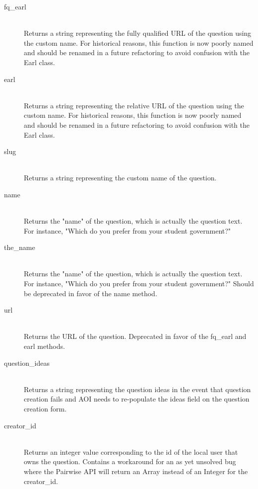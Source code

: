 \documentclass[11pt]{book}
\begin{document}
\begin{description}
  
  \item[fq\_earl]  \hfill \\
  \emph{} Returns a string representing the fully qualified URL of the question using the custom name.  For historical reasons, this function is now poorly named and should be renamed in a future refactoring to avoid confusion with the Earl class.
  
  \item[earl]  \hfill \\
  \emph{} Returns a string representing the relative URL of the question using the custom name.  For historical reasons, this function is now poorly named and should be renamed in a future refactoring to avoid confusion with the Earl class.
  
  \item[slug]  \hfill \\
  \emph{} Returns a string representing the custom name of the question.
  
  \item[name]  \hfill \\
  \emph{} Returns the "name" of the question, which is actually the question text.  For instance, "Which do you prefer from your student government?"
  
  
  \item[the\_name]  \hfill \\
  \emph{} Returns the "name" of the question, which is actually the question text.  For instance, "Which do you prefer from your student government?"  Should be deprecated in favor of the name method.
  
  \item[url]  \hfill \\
  \emph{} Returns the URL of the question.  Deprecated in favor of the fq\_earl and earl methods.


  \item[question\_ideas]  \hfill \\
  \emph{} Returns a string representing the question ideas in the event that question creation fails and AOI needs to re-populate the ideas field on the question creation form.
  
  \item[creator\_id]  \hfill \\
  \emph{} Returns an integer value corresponding to the id of the local user that owns the question.  Contains a workaround for an as yet unsolved bug where the Pairwise API will return an Array instead of an Integer for the creator\_id.


\end{description}
\end{document}
